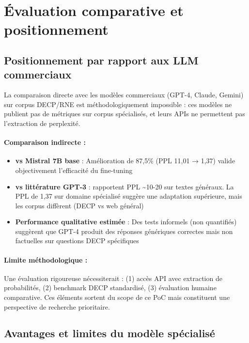 \section{Évaluation comparative et positionnement}

\subsection{Positionnement par rapport aux LLM commerciaux}

La comparaison directe avec les modèles commerciaux (GPT-4, Claude, Gemini) sur corpus DECP/RNE est méthodologiquement impossible : ces modèles ne publient pas de métriques sur corpus spécialisés, et leurs APIs ne permettent pas l'extraction de perplexité.

\paragraph{Comparaison indirecte :}
\begin{itemize}
    \item \textbf{vs Mistral 7B base} : Amélioration de 87,5\% (PPL 11,01 → 1,37) valide objectivement l'efficacité du fine-tuning
    \item \textbf{vs littérature GPT-3} : \citet{brown2020gpt3} rapportent PPL \textasciitilde{}10-20 sur textes généraux. La PPL de 1,37 sur domaine spécialisé suggère une adaptation supérieure, mais les corpus diffèrent (DECP vs web général)
    \item \textbf{Performance qualitative estimée} : Des tests informels (non quantifiés) suggèrent que GPT-4 produit des réponses génériques correctes mais non factuelles sur questions DECP spécifiques
\end{itemize}

\paragraph{Limite méthodologique :}
Une évaluation rigoureuse nécessiterait : (1) accès API avec extraction de probabilités, (2) benchmark DECP standardisé, (3) évaluation humaine comparative. Ces éléments sortent du scope de ce PoC mais constituent une perspective de recherche prioritaire.

\subsection{Avantages et limites du modèle spécialisé}

